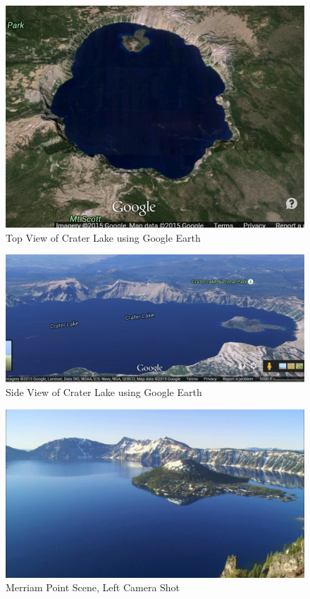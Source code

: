 \documentclass[11pt,psfig]{article}
\begin{document}
\begin{figure}[H]
\centering
\includegraphics[width=\columnwidth]{googleEarthView1.png}
\caption{Top View of Crater Lake using Google Earth}
\end{figure}
\begin{figure}[H]
\centering
\includegraphics[width=\columnwidth]{googleEarthView2.png}
\caption{Side View of Crater Lake using Google Earth}
\end{figure}
\begin{figure}[H]
\centering
\includegraphics[width=\columnwidth]{sfmPics1J2/shot4.jpg}
\caption{Merriam Point Scene, Left Camera Shot}
\end{figure}
\end{document}

